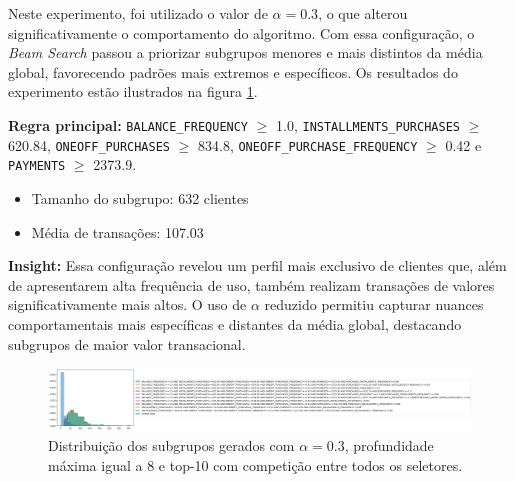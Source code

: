 \documentclass[12pt]{article}
\begin{document}
\hspace{1.2cm}Neste experimento, foi utilizado o valor de $\alpha = 0.3$, o que alterou significativamente o comportamento do algoritmo. Com essa configuração, o \textit{Beam Search} passou a priorizar subgrupos menores e mais distintos da média global, favorecendo padrões mais extremos e específicos. Os resultados do experimento estão ilustrados na figura \ref{fig:experimento21}.

\textbf{Regra principal:} \texttt{BALANCE\_FREQUENCY} $\geq$ 1.0, \texttt{INSTALLMENTS\_PURCHASES} $\geq$ 620.84, \texttt{ONEOFF\_PURCHASES} $\geq$ 834.8, \texttt{ONEOFF\_PURCHASE\_FREQUENCY} $\geq$ 0.42 e \texttt{PAYMENTS} $\geq$ 2373.9.
    \begin{itemize}
        \item Tamanho do subgrupo: 632 clientes
        \item Média de transações: 107.03
    \end{itemize}

\textbf{Insight:} Essa configuração revelou um perfil mais exclusivo de clientes que, além de apresentarem alta frequência de uso, também realizam transações de valores significativamente mais altos. O uso de $\alpha$ reduzido permitiu capturar nuances comportamentais mais específicas e distantes da média global, destacando subgrupos de maior valor transacional.

\begin{figure}[h] \centering
    \includegraphics[width=1\textwidth]{imagens/experimento2.1.png}
    \caption{Distribuição dos subgrupos gerados com $\alpha = 0.3$, profundidade máxima igual a 8 e top-10 com competição entre todos os seletores.}
    \label{fig:experimento21}
\end{figure}
\end{document}

